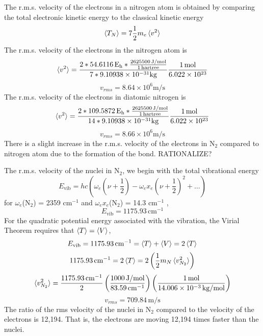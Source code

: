 \documentclass{article}
\begin{document}
The r.m.s. velocity  of the electrons in a nitrogen atom is obtained by comparing the total electronic kinetic energy to the classical kinetic energy 
\[\braket{T_N} = 7\frac{1}{2}m_e \braket{v^2} \]
The r.m.s. velocity of the electrons in the nitrogen atom is
\[\braket{v^2} = \frac{2 * 54.6116 \, \mathrm{E_h} * \frac{2625500 \, \mathrm{J/mol}} {1 \, \mathrm{hartree}}}{7 * 9.10938 \times 10^{-31} \mathrm{kg}} \frac{1 \, \mathrm{mol}}{6.022 \times 10^{23}} \]
\[v_{rms} = 8.64 \times 10^6 \mathrm{m/s}\]
The r.m.s. velocity of the electrons in diatomic nitrogen is
\[\braket{v^2} = \frac{2 * 109.5872 \, \mathrm{E_h} * \frac{2625500 \, \mathrm{J/mol}} {1 \, \mathrm{hartree}}}{14 * 9.10938 \times 10^{-31} \mathrm{kg}} \frac{1 \, \mathrm{mol}}{6.022 \times 10^{23}} \]
\[v_{rms} = 8.66 \times 10^6 \mathrm{m/s}\]
There is a slight increase in the r.m.s. velocity of the electrons in N$_2$ compared to nitrogen atom due to the formation of the bond.
RATIONALIZE?

The r.m.s. velocity of the nuclei in N$_2$, we begin with the total vibrational energy
\[E_{\mathrm{vib}} = hc\left(\omega_e (\nu + \frac{1}{2}) - \omega_e x_e  (\nu + \frac{1}{2})^2 + \dots \right) \]
for $\omega_e$(N$_2$) = 2359 cm$^{-1}$ and  $\omega_e x_e$(N$_2$) = 14.3 cm$^{-1}$ ,
\[E_{\mathrm{vib}} = 1175.93 \, \mathrm{cm}^{-1}   \]
For the quadratic potential energy associated with the vibration, the Virial Theorem requires that $\braket{T} = \braket{V}$,
\[E_{\mathrm{vib}} = 1175.93 \, \mathrm{cm}^{-1} = \braket{T} + \braket{V} = 2\braket{T}  \]
\[1175.93 \, \mathrm{cm}^{-1} = 2\braket{T} = 2 \left(\frac{1}{2} m_N \braket{v_{N_2}^2} \right)  \]
\[ \braket{v_{N_2}^2} = \frac{1175.93 \, \mathrm{cm}^{-1}  }{2} \left(\frac{1000 \, \mathrm{J/mol}}{83.59 \, \mathrm{cm}^{-1}}\right) \left(\frac{1 \, \mathrm{mol}}{14.006 \times 10^{-3} \, \mathrm{kg/mol}}\right)  \]
\[ v_{rms} = 709.84 \, \mathrm{m/s} \]
The ratio of the rms velocity of the nuclei in N$_2$ compared to the velocity of the electrons is 12,194.
That is, the electrons are moving 12,194 times faster than the nuclei. 
\end{document}
